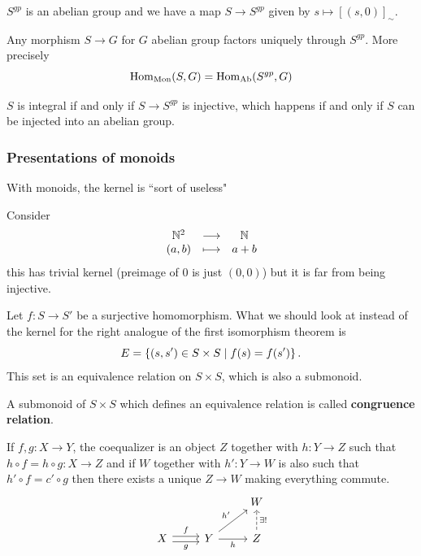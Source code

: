 \begin{remark}
$S^{gp}$ is an abelian group and we have a map $S\to S^{gp}$ given by $s\mapsto [(s,0)]_\sim$.
\end{remark}


\begin{fact}
Any morphism $S\to G$ for $G$ abelian group factors uniquely through $S^{gp}$. More precisely
\[\operatorname{Hom}_{\text{Mon}}(S,G)=\operatorname{Hom}_{\text{Ab}}(S^{gp},G)\]
\end{fact}


\begin{remark}
$S$ is integral if and only if $S\to S^{gp}$ is injective, which happens if and only if $S$ can be injected into an abelian group.
\end{remark}

\subsubsection{Presentations of monoids}
With monoids, the kernel is ``sort of useless"
\begin{example}
Consider
\[\begin{array}{ccc} {\mathbb{N}^2} & \longrightarrow & {\mathbb{N}}\\ {(a,b)} & \longmapsto & {a+b} \end{array}\]
this has trivial kernel (preimage of $0$ is just $(0,0)$) but it is far from being injective.
\end{example}

Let $f:S\to S'$ be a surjective homomorphism. What we should look at instead of the kernel for the right analogue of the first isomorphism theorem is
\[E=\left\{{(s,s')\in S\times S\mid f(s)=f(s')}\right\}.\]
This set is an equivalence relation on $S\times S$, which is also a submonoid.

\begin{definition}
A submonoid of $S\times S$ which defines an equivalence relation is called \textbf{congruence relation}.
\end{definition}

\begin{definition}[Coequalizer]
If $f,g:X\to Y$, the coequalizer is an object $Z$ together with $h:Y\to Z$ such that $h\circ f=h\circ g:X\to Z$ and if $W$ together with $h':Y\to W$ is also such that $h'\circ f=c'\circ g$ then there exists a unique $Z\to W$ making everything commute.
\[\begin{tikzcd}
	&& W \\
	X & Y & Z
	\arrow["f", shift left, from=2-1, to=2-2]
	\arrow["g"', shift right, from=2-1, to=2-2]
	\arrow["{h'}", from=2-2, to=1-3]
	\arrow["h"', from=2-2, to=2-3]
	\arrow["{\exists!}"', dashed, from=2-3, to=1-3]
\end{tikzcd}\]
\end{definition}

